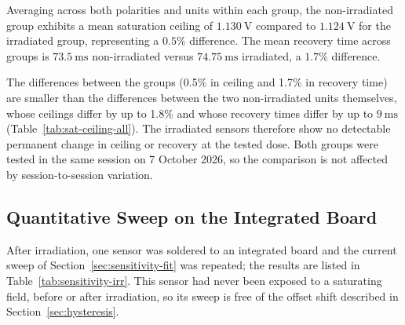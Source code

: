 \documentclass[12pt,a4paper]{article}
\begin{document}
Averaging across both polarities and units within each group, the non-irradiated group exhibits a mean saturation ceiling of $\SI{1.130}{\volt}$ compared to $\SI{1.124}{\volt}$ for the irradiated group, representing a $0.5\%$ difference. The mean recovery time across groups is $\SI{73.5}{\milli\second}$ non-irradiated versus $\SI{74.75}{\milli\second}$ irradiated, a $1.7\%$ difference.

The differences between the groups (0.5\% in ceiling and 1.7\% in recovery time) are smaller than the differences between the two non-irradiated units themselves, whose ceilings differ by up to 1.8\% and whose recovery times differ by up to $\SI{9}{\milli\second}$ (Table~\ref{tab:sat-ceiling-all}). The irradiated sensors therefore show no detectable permanent change in ceiling or recovery at the tested dose. Both groups were tested in the same session on 7 October 2026, so the comparison is not affected by session-to-session variation.


\subsection{Quantitative Sweep on the Integrated Board}
\label{sec:rad-sweep}

After irradiation, one sensor was soldered to an integrated board and the current sweep of Section~\ref{sec:sensitivity-fit} was repeated; the results are listed in Table~\ref{tab:sensitivity-irr}. This sensor had never been exposed to a saturating field, before or after irradiation, so its sweep is free of the offset shift described in Section~\ref{sec:hysteresis}.
\end{document}
